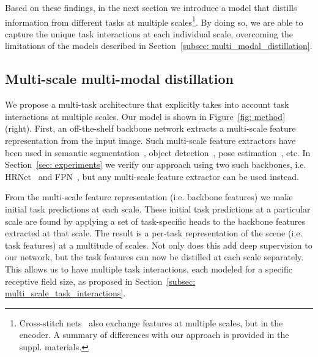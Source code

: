 \documentclass[runningheads]{llncs}
\begin{document}
Based on these findings, in the next section we introduce a model that distills information from different tasks at multiple scales\footnote{Cross-stitch nets~\cite{misra2016cross} also exchange features at multiple scales, but in the encoder. A summary of differences with our approach is provided in the suppl. materials.}. By doing so, we are able to capture the unique task interactions at each individual scale, overcoming the limitations of the models described in Section~\ref{subsec: multi_modal_distillation}.

\subsection{Multi-scale multi-modal distillation}
\label{subsec: multi_scale_distillation}
We propose a multi-task architecture that explicitly takes into account task interactions at multiple scales. Our model is shown in Figure~\ref{fig: method} (right). First, an off-the-shelf backbone network extracts a multi-scale feature representation from the input image. Such multi-scale feature extractors have been used in semantic segmentation~\cite{ronneberger2015u,wang2019deep,kirillov2019panoptic}, object detection~\cite{lin2017feature,wang2019deep}, pose estimation~\cite{newell2016stacked,sun2019deep}, etc. In Section~\ref{sec: experiments} we verify our approach using two such backbones, i.e. HRNet~\cite{wang2019deep} and FPN~\cite{lin2017feature}, but any multi-scale feature extractor can be used instead.

From the multi-scale feature representation (i.e. backbone features) we make initial task predictions at each scale. These initial task predictions at a particular scale are found by applying a set of task-specific heads to the backbone features extracted at that scale. The result is a per-task representation of the scene (i.e. task features) at a multitude of scales. Not only does this add deep supervision to our network, but the task features can now be distilled at each scale separately. This allows us to have multiple task interactions, each modeled for a specific receptive field size, as proposed in Section~\ref{subsec: multi_scale_task_interactions}.
\end{document}
